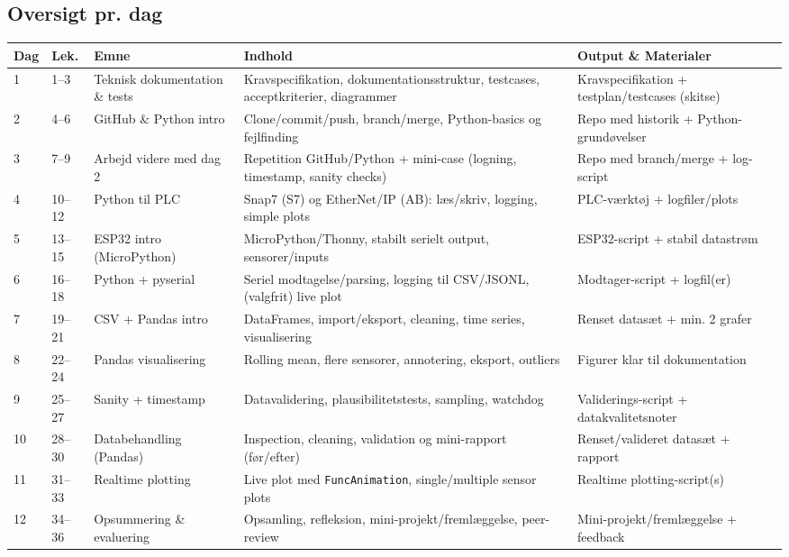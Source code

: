 \documentclass[a4paper,11pt]{article}
\begin{document}
\clearpage
\begin{landscape}
\section*{Oversigt pr. dag}
\fontsize{8}{12}\selectfont
\begin{tabular}{|p{0.8cm}|p{1cm}|p{4.2cm}|p{6.2cm}|p{8.2cm}|}
\hline
\textbf{Dag} & \textbf{Lek.} & \textbf{Emne} & \textbf{Indhold} & \textbf{Output \& Materialer} \\
\hline
1 & 1--3 & Teknisk dokumentation \& tests &
Kravspecifikation, dokumentationsstruktur, testcases, acceptkriterier, diagrammer &
Kravspecifikation + testplan/testcases (skitse) \\
\hline
2 & 4--6 & GitHub \& Python intro &
Clone/commit/push, branch/merge, Python-basics og fejlfinding &
Repo med historik + Python-grundøvelser \\
\hline
3 & 7--9 & Arbejd videre med dag 2 &
Repetition GitHub/Python + mini-case (logning, timestamp, sanity checks) &
Repo med branch/merge + log-script \\
\hline
4 & 10--12 & Python til PLC &
Snap7 (S7) og EtherNet/IP (AB): læs/skriv, logging, simple plots &
PLC-værktøj + logfiler/plots \\
\hline
5 & 13--15 & ESP32 intro (MicroPython) &
MicroPython/Thonny, stabilt serielt output, sensorer/inputs &
ESP32-script + stabil datastrøm \\
\hline
6 & 16--18 & Python + pyserial &
Seriel modtagelse/parsing, logging til CSV/JSONL, (valgfrit) live plot &
Modtager-script + logfil(er) \\
\hline
7 & 19--21 & CSV + Pandas intro &
DataFrames, import/eksport, cleaning, time series, visualisering &
Renset datasæt + min. 2 grafer \\
\hline
8 & 22--24 & Pandas visualisering &
Rolling mean, flere sensorer, annotering, eksport, outliers &
Figurer klar til dokumentation \\
\hline
9 & 25--27 & Sanity + timestamp &
Datavalidering, plausibilitetstests, sampling, watchdog &
Validerings-script + datakvalitetsnoter \\
\hline
10 & 28--30 & Databehandling (Pandas) &
Inspection, cleaning, validation og mini-rapport (før/efter) &
Renset/valideret datasæt + rapport \\
\hline
11 & 31--33 & Realtime plotting &
Live plot med \texttt{FuncAnimation}, single/multiple sensor plots &
Realtime plotting-script(s) \\
\hline
12 & 34--36 & Opsummering \& evaluering &
Opsamling, refleksion, mini-projekt/fremlæggelse, peer-review &
Mini-projekt/fremlæggelse + feedback \\
\hline
\end{tabular}
\end{landscape}
\end{document}
